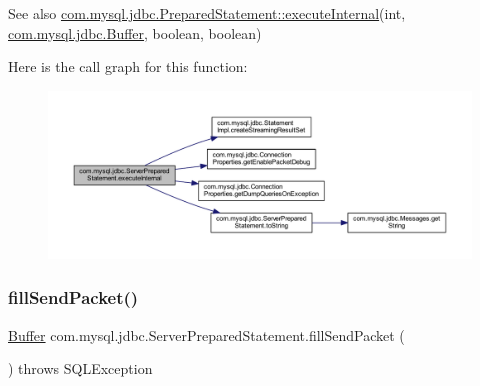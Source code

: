 \begin{DoxySeeAlso}{See also}
\mbox{\hyperlink{classcom_1_1mysql_1_1jdbc_1_1_prepared_statement_a7d300759d88bba2536598e70808c3b6b}{com.\+mysql.\+jdbc.\+Prepared\+Statement\+::execute\+Internal}}(int, \mbox{\hyperlink{classcom_1_1mysql_1_1jdbc_1_1_buffer}{com.\+mysql.\+jdbc.\+Buffer}}, boolean, boolean) 
\end{DoxySeeAlso}
Here is the call graph for this function\+:
\nopagebreak
\begin{figure}[H]
\begin{center}
\leavevmode
\includegraphics[width=350pt]{classcom_1_1mysql_1_1jdbc_1_1_server_prepared_statement_ab1c4ba57b38c1e90faeb9e29097f2fd2_cgraph}
\end{center}
\end{figure}
\mbox{\label{classcom_1_1mysql_1_1jdbc_1_1_server_prepared_statement_acb89d97637dff8b751928da915cecda1}} 
\subsubsection{\texorpdfstring{fill\+Send\+Packet()}{fillSendPacket()}\hspace{0.1cm}{\footnotesize\ttfamily [1/2]}}
{\footnotesize\ttfamily \mbox{\hyperlink{classcom_1_1mysql_1_1jdbc_1_1_buffer}{Buffer}} com.\+mysql.\+jdbc.\+Server\+Prepared\+Statement.\+fill\+Send\+Packet (\begin{DoxyParamCaption}{ }\end{DoxyParamCaption}) throws S\+Q\+L\+Exception\hspace{0.3cm}{\ttfamily [protected]}}

